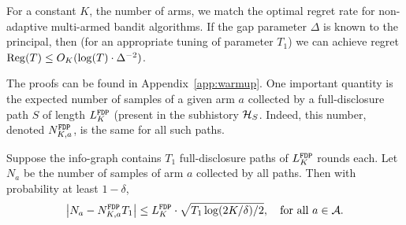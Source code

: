 \begin{remark}
For a constant $K$, the number of arms, we match the optimal regret rate for non-adaptive multi-armed bandit algorithms. If the gap parameter $\Delta$ is known to the principal, then (for an appropriate tuning of parameter $T_1$) we can achieve regret
  $\mathrm{Reg}(T) \leq O_K(\log(T) \cdot \Delta^{-2})$.
\end{remark}

The proofs can be found in Appendix~\ref{app:warmup}. One important quantity is the expected number of samples of a given arm $a$ collected by a full-disclosure path $S$ of length $L^\mathtt{FDP}_K$ (\ie present in the subhistory $\mathcal{H}_{S}$. Indeed, this number, denoted $N^\mathtt{FDP}_{K,a}$, is the same for all such paths. 

\begin{lemma}\label{lem:t1runs}
Suppose the info-graph contains $T_1$ full-disclosure paths of $L^\mathtt{FDP}_K$ rounds each. Let $N_a$ be the number of samples of arm $a$ collected by all paths. Then with probability at
  least $1-\delta$, 
  \[
    \left| N_a - N^\mathtt{FDP}_{K,a} T_1\right| \leq L^\mathtt{FDP}_K\cdot \sqrt{T_1 \log(2K/\delta) / 2},\quad
    \text{for all $a\in \mathcal{A}$}.
  \]
\end{lemma}






